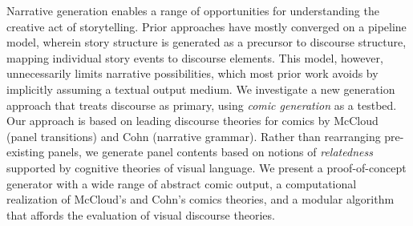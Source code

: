 Narrative generation enables a range of opportunities for understanding 
the creative act of storytelling.
Prior approaches have mostly converged on a pipeline model, wherein story
structure is generated as a precursor to discourse structure, mapping
individual story events to discourse elements. 
This model, however, unnecessarily limits narrative possibilities,
which most prior work avoids by implicitly assuming a textual output
medium.
%
We investigate a new generation approach that treats discourse as
primary, using {\em comic generation} as a testbed.  Our approach is based
on leading discourse theories for comics by McCloud (panel transitions) and
Cohn (narrative grammar). Rather than rearranging pre-existing panels, we
generate panel contents based on notions of {\em relatedness} supported by
cognitive theories of visual language.
We present a proof-of-concept generator with a wide range of abstract comic
output, a computational realization of McCloud's and Cohn's comics
theories, and a modular algorithm that affords the evaluation of visual
discourse theories.


